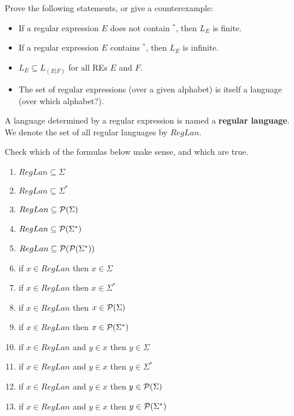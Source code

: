 \begin{exercise}
Prove the following statements, or give a counterexample:

\begin{itemize}
\item If a regular expression $E$ does not contain $^*$, then $L_E$ is
finite.

\item If a regular expression $E$ contains $^*$, then $L_E$ is infinite.

\item $L_E \subseteq L_{(E|F)}$ for all REs $E$ and $F$.

\item The set of regular expressions (over a given alphabet) is itself a
language (over which alphabet?).
\end{itemize}
\end{exercise}


\medskip

\begin{definition}
A language determined by a regular expression is named a {\bf regular language}. We denote the set of all regular languages by $RegLan$.
\end{definition}

\begin{exercise}
Check which of the formulas below make sense, and which are true.

\begin{enumerate}
\item $RegLan \subseteq \Sigma$
\item $RegLan \subseteq \Sigma^*$
\item $RegLan \subseteq {\cal P}(\Sigma)$
\item $RegLan \subseteq {\cal P}(\Sigma^*)$
\item $RegLan \subseteq {\cal P}({\cal P}(\Sigma^*))$
\item if $x \in RegLan$ then $x \in \Sigma$
\item if $x \in RegLan$ then $x \in \Sigma^*$
\item if $x \in RegLan$ then $x \in {\cal P}(\Sigma)$
\item if $x \in RegLan$ then $x \in {\cal P}(\Sigma^*)$
\item if $x \in RegLan$ and $y \in x$ then $y \in \Sigma$
\item if $x \in RegLan$ and $y \in x$ then $y \in \Sigma^*$
\item if $x \in RegLan$ and $y \in x$ then $y \in {\cal P}(\Sigma)$
\item if $x \in RegLan$ and $y \in x$ then $y \in {\cal P}(\Sigma^*)$
\end{enumerate}
\end{exercise}

